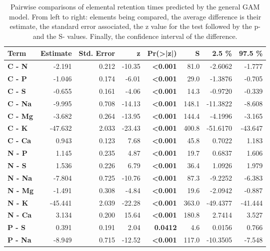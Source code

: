 \begin{table}[H]
\centering
\caption{\label{tab:table_pairs_i_rt}Pairwise comparisons of elemental retention times predicted by the general GAM model. From left to right: elements being compared, the average difference is their estimate, the standard error associated, the z value for the test followed by the p- and the S- values. Finally, the confidence interval of the difference.}
\centering
\begin{tabular}[t]{>{}lrrr>{}rrrr}
\toprule
\textbf{Term} & \textbf{Estimate} & \textbf{Std. Error} & \textbf{z} & \textbf{Pr(>|z|)} & \textbf{S} & \textbf{2.5 \%} & \textbf{97.5 \%}\\
\midrule
\textbf{C - N} & -2.191 & 0.212 & -10.35 & \textbf{<0.001} & 81.0 & -2.6062 & -1.777\\
\textbf{C - P} & -1.046 & 0.174 & -6.01 & \textbf{<0.001} & 29.0 & -1.3876 & -0.705\\
\textbf{C - S} & -0.655 & 0.161 & -4.06 & \textbf{<0.001} & 14.3 & -0.9720 & -0.339\\
\textbf{C - Na} & -9.995 & 0.708 & -14.13 & \textbf{<0.001} & 148.1 & -11.3822 & -8.608\\
\textbf{C - Mg} & -3.682 & 0.264 & -13.95 & \textbf{<0.001} & 144.4 & -4.1996 & -3.165\\
\textbf{C - K} & -47.632 & 2.033 & -23.43 & \textbf{<0.001} & 400.8 & -51.6170 & -43.647\\
\textbf{C - Ca} & 0.943 & 0.123 & 7.68 & \textbf{<0.001} & 45.8 & 0.7022 & 1.183\\
\textbf{N - P} & 1.145 & 0.235 & 4.87 & \textbf{<0.001} & 19.7 & 0.6837 & 1.606\\
\textbf{N - S} & 1.536 & 0.226 & 6.79 & \textbf{<0.001} & 36.4 & 1.0926 & 1.979\\
\textbf{N - Na} & -7.804 & 0.725 & -10.76 & \textbf{<0.001} & 87.3 & -9.2252 & -6.383\\
\textbf{N - Mg} & -1.491 & 0.308 & -4.84 & \textbf{<0.001} & 19.6 & -2.0942 & -0.887\\
\textbf{N - K} & -45.441 & 2.039 & -22.28 & \textbf{<0.001} & 363.0 & -49.4377 & -41.444\\
\textbf{N - Ca} & 3.134 & 0.200 & 15.64 & \textbf{<0.001} & 180.8 & 2.7414 & 3.527\\
\textbf{P - S} & 0.391 & 0.191 & 2.04 & \textbf{0.0412} & 4.6 & 0.0156 & 0.766\\
\textbf{P - Na} & -8.949 & 0.715 & -12.52 & \textbf{<0.001} & 117.0 & -10.3505 & -7.548\\

\end{tabular}
\end{table}
